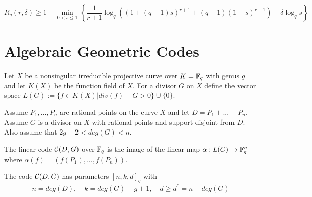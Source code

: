 \begin{equation}
R_q (r,\delta) \geq 1 - \min_{0 < s \leq 1} \left\lbrace \frac{1}{r+1}\log_q ((1+(q-1)s)^{r+1}+(q-1)(1-s)^{r+1})-\delta \log_q s \right\rbrace
\end{equation}

\section{Algebraic Geometric Codes}

Let $X$ be a nonsingular irreducible projective curve over $K={\mathbb F}_q$ with genus $g$ and let $K(X)$ be the function field of $X$. For a divisor $G$ on $X$ define the vector space $L(G) := \{ f \in K(X) \vert div(f) + G > 0\} \cup \{0\}$.

Assume $P_1, ..., P_n$ are rational points on the curve $X$ and let $D = P_1 + ... + P_n$. Assume $G$ is a divisor on $X$ with rational points and support disjoint from $D$. Also assume that $2g - 2 < deg(G) < n$.

\begin{defn}
The linear code ${\mathcal C}(D,G)$ over ${\mathbb F}_q$ is the image of the linear map $\alpha: L(G) \rightarrow {\mathbb F}_q^n$ where $\alpha(f) = (f(P_1), ... , f(P_n))$.
\end{defn}

\begin{thm}
The code ${\mathcal C}(D,G)$ has parameters $[n,k,d]_q$ with
$$n = deg(D), \quad k = deg(G)-g+1, \quad d \geq d^\ast = n - deg(G)$$
\end{thm}
